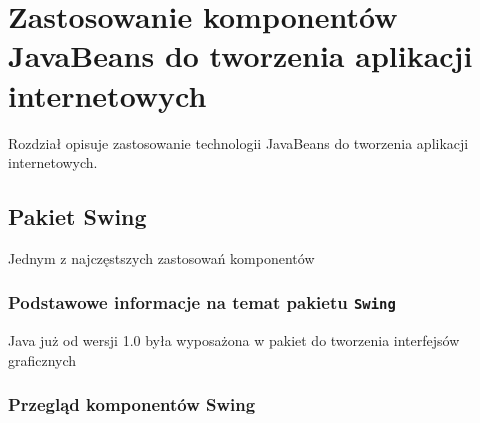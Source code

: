 \chapter{Zastosowanie komponentów JavaBeans do tworzenia aplikacji internetowych}
Rozdział opisuje zastosowanie technologii JavaBeans do tworzenia aplikacji
internetowych.
\section{Pakiet Swing}
Jednym z najczęstszych zastosowań komponentów 
\subsection{Podstawowe informacje na temat pakietu \texttt{Swing}}
Java już od wersji 1.0 była wyposażona w pakiet do tworzenia interfejsów graficznych
\subsection{Przegląd komponentów Swing}